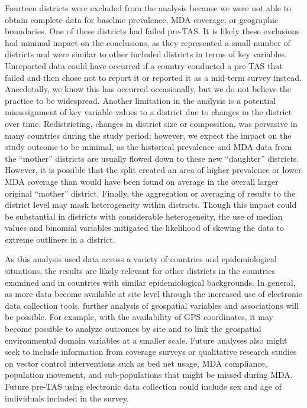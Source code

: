 \documentclass[11pt,a4paper]{article}
\begin{document}
Fourteen districts were excluded from the analysis because we were not able to obtain complete data for baseline prevalence, MDA coverage, or geographic boundaries. One of these districts had failed pre-TAS. It is likely these exclusions had minimal impact on the conclusions, as they represented a small number of districts and were similar to other included districts in terms of key variables. Unreported data could have occurred if a country conducted a pre-TAS that failed and then chose not to report it or reported it as a mid-term survey instead. Anecdotally, we know this has occurred occasionally, but we do not believe the practice to be widespread. Another limitation in the analysis is a potential misassignment of key variable values to a district due to changes in the district over time. Redistricting, changes in district size or composition, was pervasive in many countries during the study period; however, we expect the impact on the study outcome to be minimal, as the historical prevalence and MDA data from the “mother” districts are usually flowed down to these new “daughter” districts. However, it is possible that the split created an area of higher prevalence or lower MDA coverage than would have been found on average in the overall larger original “mother” district. Finally, the aggregation or averaging of results to the district level may mask heterogeneity within districts. Though this impact could be substantial in districts with considerable heterogeneity, the use of median values and binomial variables mitigated the likelihood of skewing the data to extreme outliners in a district.

As this analysis used data across a variety of countries and epidemiological situations, the results are likely relevant for other districts in the countries examined and in countries with similar epidemiological backgrounds. In general, as more data become available at site level through the increased use of electronic data collection tools, further analysis of geospatial variables and associations will be possible. For example, with the availability of GPS coordinates, it may become possible to analyze outcomes by site and to link the geospatial environmental domain variables at a smaller scale. Future analyses also might seek to include information from coverage surveys or qualitative research studies on vector control interventions such as bed net usage, MDA compliance, population movement, and sub-populations that might be missed during MDA. Future pre-TAS using electronic data collection could include sex and age of individuals included in the survey.
\end{document}
